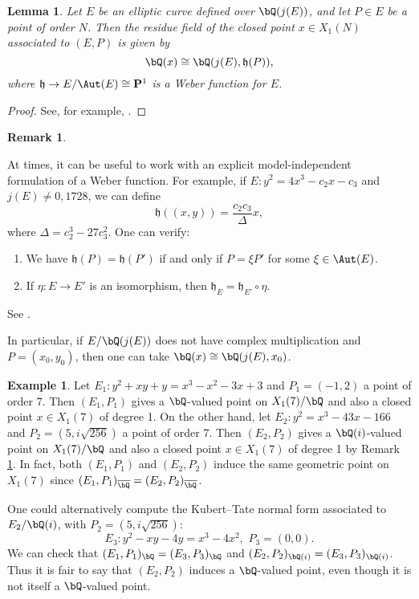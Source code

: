\documentclass[11pt,reqno]{amsart}
\theoremstyle{plain}
\newtheorem{lemma}[theorem]{Lemma}
\theoremstyle{definition}
\newtheorem{remark}[theorem]{Remark}
\newtheorem{example}[theorem]{Example}
\newcommand{\Q}{\bQ}
\newcommand{\abedit}[1]{{\color{blue} #1}}
\begin{document}
\begin{lemma}\label{ResidueFieldLemma}
Let $E$ be an elliptic curve defined over $\Q(j(E))$, and let $P \in E$ be a point of order $N$. Then the residue field of the closed point $x \in X_1(N)$ associated to $(E,P)$ is given by
\[
\Q(x)\cong\Q(j(E),\mathfrak{h}(P)),
\]
where $\mathfrak{h} \rightarrow E/\Aut(E) \cong \mathbf{P}^1$ is a Weber function for $E$.
\end{lemma}

\begin{proof}
See, for example, \cite[Lemma 2.5]{BourdonNajman2021}.%
\end{proof}


 \begin{remark}\label{ResidueFieldRmk}\abedit{At times, it can be useful to work with an explicit model-independent formulation of a Weber function. For example, if $E:y^2=4x^3-c_2x-c_3$ and $j(E)\neq 0,1728$, we can define
\[
\mathfrak{h}((x,y))=\frac{c_2c_3}{\Delta}x,
\]
where $\Delta=c_2^3-27c_3^2$. One can verify:
\begin{enumerate}
    \item We have $\mathfrak{h}(P)=\mathfrak{h}(P')$ if and only if $P=\xi P'$ for some $\xi \in \Aut(E)$.
    \item If $\eta: E \rightarrow E'$ is an isomorphism, then $\mathfrak{h}_E=\mathfrak{h}_{E'}\circ \eta$.
\end{enumerate}
See \cite[p. 107]{shimura}.} In particular, if $E/\Q(j(E))$ does not have complex multiplication and $P=(x_0,y_0)$, then one can take $\Q(x)\cong\Q(j(E),x_0)$. 
\end{remark}
\begin{example}
Let $E_1:y^2+xy+y=x^3-x^2-3x+3$ and $P_1=(-1,2)$ a point of order 7. Then $(E_1,P_1)$ gives a $\Q$-valued point on $X_1(7)/\Q$ and also a closed point $x\in X_1(7)$ of degree 1. On the other hand, let $E_2:y^2=x^3-43x-166$ and $P_2=(5,i\sqrt{256})$ a point of order 7. Then $(E_2,P_2)$ gives a $\Q(i)$-valued point on $X_1(7)/\Q$ and also a closed point $x\in X_1(7)$ of degree 1 by Remark \ref{ResidueFieldRmk}. In fact, both $(E_1,P_1)$ and $(E_2,P_2)$ induce the same geometric point on $X_1(7)$ since $(E_1,P_1)_{\overline{\Q}}=(E_2,P_2)_{\overline{\Q}}$.

One could alternatively compute the Kubert--Tate normal form associated to $E_2/\Q(i)$, with $P_2=(5,i\sqrt{256})$:
\[E_3: y^2-xy-4y=x^3-4x^2,\, \, P_3=(0,0).
\]
We can check that $(E_1,P_1)_{\Q}=(E_3,P_3)_{\Q}$ and $(E_2,P_2)_{\Q(i)} =(E_3,P_3)_{\Q(i)}$. Thus it is fair to say that $(E_2,P_2)$ induces a $\Q$-valued point, even though it is not itself a $\Q$-valued point.
\end{example}
\end{document}
